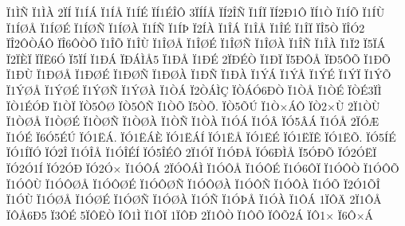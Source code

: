 {^^cf1^^cc^^d1
^^cf1^^cc^^c0
2^^cf^^cd
^^cf1^^cd^^c1
^^cf1^^cd^^c5
^^cf1^^cd^^c9
^^cf^^cd1^^c9^^ce^^d4
3^^cf^^cd^^cd^^c5
^^cf^^cd2^^ce^^d1
^^cf1^^cd^^cf
^^cf^^cd2^^d01^^d4
^^cf^^cd1^^d2
^^cf1^^cd^^d5
^^cf1^^cd^^d9
^^cf1^^cd^^d8^^c5
^^cf1^^cd^^d8^^c9
^^cf1^^cd^^d8^^d1
^^cf1^^cd^^d8^^c0
^^cf1^^cd^^d1
^^cf1^^cd^^de
^^cf2^^cd^^c0
^^cf1^^ce^^c1
^^cf1^^ce^^c5
^^cf1^^ce^^c9
^^cf1^^ce^^cf
^^cf^^ce5^^d2
^^cf^^ce^^d32
^^cf^^ce2^^d4^^d2^^c1^^d4
^^cf^^ce6^^d4^^d2^^d5
^^cf1^^ce^^d5
^^cf1^^ce^^d9
^^cf1^^ce^^d8^^c5
^^cf1^^ce^^d8^^c9
^^cf1^^ce^^d8^^d1
^^cf1^^ce^^d8^^c0
^^cf1^^ce^^d1
^^cf1^^ce^^c0
^^cf1^^cf2
^^cf5^^cf^^c1
^^cf2^^cf^^c8^^cf
^^cf^^cf^^cb6^^d3
^^cf5^^cf^^cd
^^cf1^^d0^^c1
^^cf^^d0^^c1^^cc^^c55
^^cf1^^d0^^c5
^^cf1^^d0^^c9
2^^cf^^d0^^c9^^d2
^^cf1^^d0^^cf
^^cf5^^d0^^d4^^c5
^^cf^^d05^^d4^^d5
^^cf1^^d0^^d5
^^cf1^^d0^^d9
^^cf1^^d0^^d8^^c5
^^cf1^^d0^^d8^^c9
^^cf1^^d0^^d8^^d1
^^cf1^^d0^^d8^^c0
^^cf1^^d0^^d1
^^cf1^^d0^^c0
^^cf1^^dd^^c1
^^cf1^^dd^^c5
^^cf1^^dd^^c9
^^cf1^^dd^^cf
^^cf1^^dd^^d5
^^cf1^^dd^^d8^^c5
^^cf1^^dd^^d8^^c9
^^cf1^^dd^^d8^^d1
^^cf1^^dd^^d8^^c0
^^cf1^^d2^^c1
^^cf2^^d2^^c1^^cc^^c7
^^cf^^d2^^c1^^d36^^d0^^d2
^^cf1^^d2^^c5
^^cf1^^d2^^c9
^^cf^^d2^^c93^^cf^^cc
^^cf^^d21^^c9^^d3^^d0
^^cf1^^d2^^cf
^^cf^^d25^^d4^^d8
^^cf^^d25^^d4^^d1
^^cf1^^d2^^d5
^^cf5^^d2^^d5.
^^cf^^d25^^d5^^da
^^cf1^^d2^^d7^^c1^^d4
^^cf^^d22^^d7^^d9
2^^cf1^^d2^^d9
^^cf1^^d2^^d8^^c5
^^cf1^^d2^^d8^^c9
^^cf1^^d2^^d8^^d1
^^cf1^^d2^^d8^^c0
^^cf1^^d2^^d1
^^cf1^^d2^^c0
^^cf1^^d3^^c1
^^cf1^^d3^^c2
^^cf^^d35^^c2^^c1
^^cf1^^d3^^c5
2^^cf^^d3^^c6
^^cf1^^d3^^c9
^^cf6^^d35^^c9^^da
^^cf^^d31^^cb^^c1.
^^cf^^d31^^cb^^c1^^c8
^^cf^^d31^^cb^^c1^^cd
^^cf^^d31^^cb^^c5
^^cf^^d31^^cb^^c9
^^cf^^d31^^cb^^cf^^ca
^^cf^^d31^^cb^^d5.
^^cf^^d35^^cd^^c9
^^cf^^d31^^cd^^cf^^d3
^^cf^^d32^^ce
^^cf1^^d3^^ce^^c5
^^cf1^^d3^^ce^^c9^^cd
^^cf^^d35^^ce^^c9^^d4
2^^cf1^^d3^^cf
^^cf1^^d3^^d0^^c5
^^cf^^d36^^d0^^cc^^c5
^^cf5^^d3^^d0^^d5
^^cf^^d32^^d3^^cb^^cf
^^cf^^d32^^d31^^cd
^^cf^^d32^^d3^^d0
^^cf^^d32^^d3^^d7
^^cf1^^d3^^d4^^c1
2^^cf^^d3^^d4^^c1^^cc
^^cf1^^d3^^d4^^c5
^^cf1^^d3^^d4^^c9
^^cf1^^d36^^d4^^cf
^^cf1^^d3^^d4^^d2
^^cf1^^d3^^d4^^d5
^^cf1^^d3^^d4^^d9
^^cf1^^d3^^d4^^d8^^c5
^^cf1^^d3^^d4^^d8^^c9
^^cf1^^d3^^d4^^d8^^d1
^^cf1^^d3^^d4^^d8^^c0
^^cf1^^d3^^d4^^d1
^^cf1^^d3^^d4^^c0
^^cf1^^d3^^d5
^^cf2^^d31^^d5^^ce
^^cf1^^d3^^d9
^^cf1^^d3^^d8^^c5
^^cf1^^d3^^d8^^c9
^^cf1^^d3^^d8^^d1
^^cf1^^d3^^d8^^c0
^^cf1^^d3^^d1
^^cf1^^d3^^de^^c5
^^cf1^^d3^^c0
^^cf1^^d4^^c1
1^^cf^^d4^^c4
2^^cf1^^d4^^c5
^^cf^^d4^^c56^^d05
^^cf3^^d4^^c9
5^^cf^^d4^^cb^^d2
^^cf^^d41^^cc
^^cf1^^d4^^cf
1^^cf^^d4^^d0
2^^cf1^^d4^^d2
^^cf1^^d4^^d5
^^cf^^d4^^d52^^c1
^^cf^^d41^^d7
^^cf6^^d4^^d7^^c1
}
